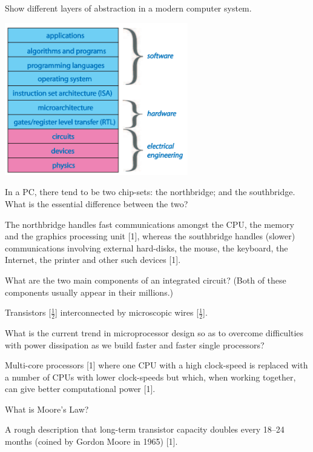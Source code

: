 \documentclass{exam}
\begin{document}
\begin{questions}
\question[4]Show different layers of abstraction in a modern computer system.
\begin{solution}[2in]
\includegraphics[width=8cm]{CSys.png}
\end{solution}
\newpage
\question[2]In a PC, there tend to be two chip-sets: the northbridge; and the
southbridge. What is the essential difference between the two?
\begin{solution}[2in]
The northbridge handles fast communications amongst the CPU, the
memory and the graphics processing unit [1], whereas the southbridge
handles (slower) communications involving external hard-disks, the
mouse, the keyboard, the Internet, the printer and other such devices
[1].
\end{solution}

\question[1]What are the two main components of an integrated circuit? (Both of
these components usually appear in their millions.)
\begin{solution}[2in]
Transistors [$\frac{1}{2}$] interconnected by microscopic wires [$\frac{1}{2}$].
\end{solution}

\question[2]What is the current trend in microprocessor design so as to overcome
difficulties with power dissipation as we build faster and faster single
processors?
\begin{solution}[2in]
Multi-core processors [1] where one CPU with a high clock-speed is
replaced with a number of CPUs with lower clock-speeds but which,
when working together, can give better computational power [1].
\end{solution}

\question[1]What is Moore’s Law?
\begin{solution}[2in]
A rough description that long-term transistor capacity doubles every
18–24 months (coined by Gordon Moore in 1965) [1].
\end{solution}


\end{questions}
\end{document}
